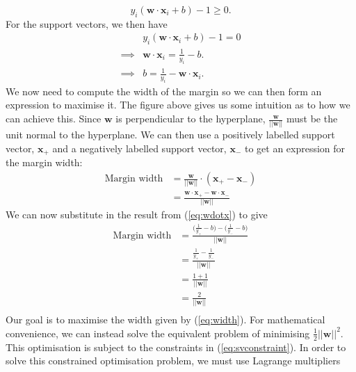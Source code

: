 \documentclass[12pt,a4paper,twoside,openright]{report}
\begin{document}
\begin{equation}
	y_i(\mathbf{w} \cdot \mathbf{x}_i + b) - 1 \ge 0.
\end{equation}
For the support vectors, we then have
\begin{align}
	& y_i(\mathbf{w} \cdot \mathbf{x}_i + b) - 1 = 0 \label{eq:svconstraint}\\
	\implies & \mathbf{w} \cdot \mathbf{x}_i = \frac{1}{y_i} - b. \label{eq:wdotx} \\
	\implies & b = \frac{1}{y_i} - \mathbf{w} \cdot \mathbf{x}_i. \label{eq:b}
\end{align}
\newline
\newline
We now need to compute the width of the margin so we can then form an expression to maximise it. The figure above gives us some intuition as to how we can achieve this. Since $\mathbf{w}$ is perpendicular to the hyperplane, $\frac{\mathbf{w}}{||\mathbf{w}||}$ must be the unit normal to the hyperplane. We can then use a positively labelled support vector, $\mathbf{x}_+$ and a negatively labelled support vector, $\mathbf{x}_-$ to get an expression for the margin width:
\begin{equation}
\begin{aligned}
	\text{Margin width} & = \frac{\mathbf{w}}{||\mathbf{w}||} \cdot (\mathbf{x}_+ - \mathbf{x}_-) \\
	& = \frac{\mathbf{w} \cdot \mathbf{x}_+ - \mathbf{w} \cdot \mathbf{x}_-}{||\mathbf{w}||}
\end{aligned}
\end{equation}
We can now substitute in the result from (\ref{eq:wdotx}) to give
\begin{equation} \label{eq:width}
\begin{aligned}
\text{Margin width} & = \frac{\big(\frac{1}{y_+} - b\big) - \big(\frac{1}{y_-} - b\big)}{||\mathbf{w}||} \\
& = \frac{\frac{1}{y_+} - \frac{1}{y_-}}{||\mathbf{w}||} \\
& = \frac{1 + 1}{||\mathbf{w}||} \\
& = \frac{2}{||\mathbf{w}||} \\
\end{aligned}
\end{equation}
Our goal is to maximise the width given by (\ref{eq:width}). For mathematical convenience, we can instead solve the equivalent problem of minimising $\frac{1}{2}||\mathbf{w}||^2$. This optimisation is subject to the constraints in (\ref{eq:svconstraint}). In order to solve this constrained optimisation problem, we must use Lagrange multipliers
\end{document}
